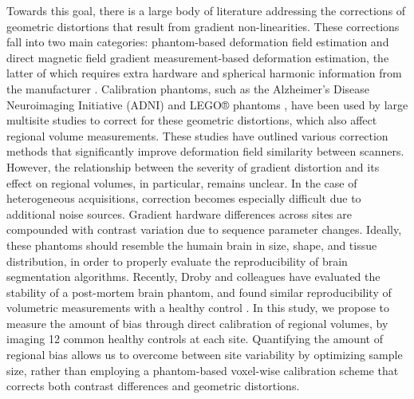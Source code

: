 Towards this goal, there is a large body of literature addressing the corrections of geometric distortions that result from gradient non-linearities. These corrections fall into two main categories: phantom-based deformation field estimation and direct magnetic field gradient measurement-based deformation estimation, the latter of which requires extra hardware and spherical harmonic information from the manufacturer \cite{fonov2010improved}. Calibration phantoms, such as the Alzheimer's Disease Neuroimaging Initiative (ADNI) \cite{gunter2009measurement} and LEGO® phantoms \cite{caramanos2010gradient}, have been used by large multisite studies to correct for these geometric distortions, which also affect regional volume measurements. These studies have outlined various correction methods that significantly improve deformation field similarity between scanners. However, the relationship between the severity of gradient distortion and its effect on regional volumes, in particular, remains unclear. In the case of heterogeneous acquisitions, correction becomes especially difficult due to additional noise sources. Gradient hardware differences across sites are compounded with contrast variation due to sequence parameter changes. Ideally, these phantoms should resemble the humain brain in size, shape, and tissue distribution, in order to properly evaluate the reproducibility of brain segmentation algorithms. Recently, Droby and colleagues have evaluated the stability of a post-mortem brain phantom, and found similar reproducibility of volumetric measurements with a healthy control \cite{droby2015human}. In this study, we propose to measure the amount of bias through direct calibration of regional volumes, by imaging 12 common healthy controls at each site. Quantifying the amount of regional bias allows us to overcome between site variability by optimizing sample size, rather than employing a phantom-based voxel-wise calibration scheme that corrects both contrast differences and geometric distortions. 